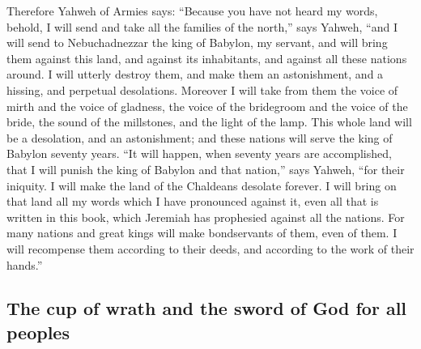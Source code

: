  Therefore Yahweh of Armies says: ``Because you have not
heard my words,  behold, I will send and take all the
families of the north,'' says Yahweh, ``and I will send to
Nebuchadnezzar the king of Babylon, my servant, and will bring them
against this land, and against its inhabitants, and against all these
nations around. I will utterly destroy them, and make them an
astonishment, and a hissing, and perpetual desolations. 
Moreover I will take from them the voice of mirth and the voice of
gladness, the voice of the bridegroom and the voice of the bride, the
sound of the millstones, and the light of the lamp.  This
whole land will be a desolation, and an astonishment; and these nations
will serve the king of Babylon seventy years.  ``It will
happen, when seventy years are accomplished, that I will punish the king
of Babylon and that nation,'' says Yahweh, ``for their iniquity. I will
make the land of the Chaldeans desolate forever.  I will
bring on that land all my words which I have pronounced against it, even
all that is written in this book, which Jeremiah has prophesied against
all the nations.  For many nations and great kings will
make bondservants of them, even of them. I will recompense them
according to their deeds, and according to the work of their hands.''

\hypertarget{the-cup-of-wrath-and-the-sword-of-god-for-all-peoples}{%
\subsection{The cup of wrath and the sword of God for all
peoples}\label{the-cup-of-wrath-and-the-sword-of-god-for-all-peoples}}

